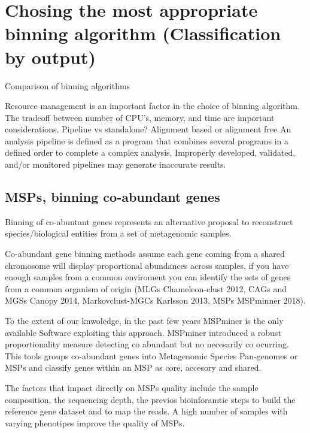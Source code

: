 \documentclass{article}
\begin{document}
\section{Chosing the most appropriate binning algorithm (Classification by output)}
\begin{sidewaystable}
\begin{tiny}
\centering
\caption[Comparison of binning algorithms]{Comparison of binning algorithms}
	
\label{Tbinningsoftware}
\end{tiny}
\end{sidewaystable}

Resource management is an important factor in the choice of binning algorithm.
The tradeoff between number of CPU's, memory, and time are important considerations.
Pipeline vs standalone?
Alignment based or alignment free
An analysis pipeline is defined as a program that combines several programs in a defined order to complete a complex analysis.
Improperly developed, validated, and/or monitored pipelines may generate inaccurate results.

\subsection{MSPs, binning co-abundant genes}

Binning of co-abuntant genes represents an alternative proposal to reconstruct species/biological entities from a set of metagenomic samples.

Co-abundant gene binning methods assume each gene coming from a shared chromosome will display proportional abundances across samples, if you have enough samples from a common enviroment you can identify the sets of genes from a common organism of origin (MLGs Chameleon-clust 2012, CAGs and MGSs Canopy 2014, Markovclust-MGCs Karlsson 2013, MSPs MSPminner 2018).

To the extent of our knwoledge, in the past few years MSPminer is the only available Software exploiting this approach. MSPminer introduced a robust proportionality measure detecting co abundant but no necesarily co ocurring. This tools groups co-abundant genes into Metagenomic Species Pan-genomes or MSPs and classify genes within an MSP as core, accesory and shared.  

The factors that impact directly on MSPs quality include the sample composition, the sequencing depth, the previos bioinforamtic steps to build the reference gene dataset and to map the reads.
A high number of samples with varying phenotipes improve the quality of MSPs.
\end{document}

